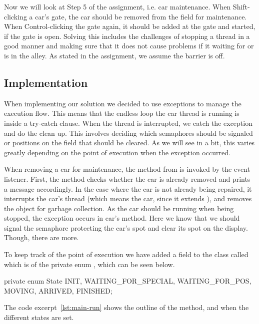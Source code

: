 
Now we will look at Step 5 of the assignment, i.e. car
maintenance. When Shift-clicking a car's gate, the car should be
removed from the field for maintenance. When Control-clicking the gate
again, it should be added at the gate and started, if the gate is
open. Solving this includes the challenges of stopping a thread in a
good manner and making sure that it does not cause problems if it
waiting for or is in the alley. As stated in the assignment, we assume
the barrier is off.


\subsection{Implementation}
\label{sub:main-moni}
When implementing our solution we decided to use exceptions to manage
the execution flow. This means that the endless loop the car thread is
running is inside a try-catch clause. When the thread is interrupted,
we catch the exception and do the clean up. This involves deciding
which semaphores should be signaled or positions on the field that
should be cleared. As we will see in a bit, this varies greatly
depending on the point of execution when the exception occurred.

When removing a car for maintenance, the  method
from  is invoked by the event listener. First, the
method checks whether the car is already removed and prints a message
accordingly. In the case where the car is not already being repaired,
it interrupts the car's thread (which means the car, since it extends
), and removes the object for garbage
collection. As the car should be running when being stopped, the
exception occurs in car's  method. Here we know that we
should signal the semaphore protecting the car's spot and clear its
spot on the display. Though, there are more.

To keep track of the point of execution we have added a field to the
 class called  which is of the private enum
, which can be seen below.

\begin{java}
private enum State {
    INIT,
    WAITING_FOR_SPECIAL,
    WAITING_FOR_POS,
    MOVING,
    ARRIVED,
    FINISHED;
}
\end{java}

The code excerpt~\ref{lst:main-run} shows the outline of the
 method, and when the different states are set.


